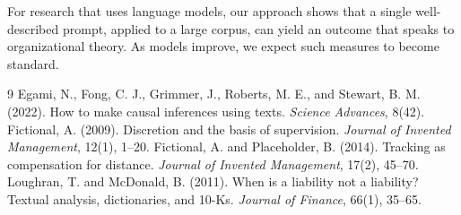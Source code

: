 \documentclass[12pt]{article}
\begin{document}
For research that uses language models, our approach shows that a single well-described prompt, applied to a large corpus, can yield an outcome that speaks to organizational theory. As models improve, we expect such measures to become standard.

\begin{thebibliography}{9}
 Egami, N., Fong, C. J., Grimmer, J., Roberts, M. E., and Stewart, B. M. (2022). How to make causal inferences using texts. \emph{Science Advances}, 8(42).
 Fictional, A. (2009). Discretion and the basis of supervision. \emph{Journal of Invented Management}, 12(1), 1--20.
 Fictional, A. and Placeholder, B. (2014). Tracking as compensation for distance. \emph{Journal of Invented Management}, 17(2), 45--70.
 Loughran, T. and McDonald, B. (2011). When is a liability not a liability? Textual analysis, dictionaries, and 10-Ks. \emph{Journal of Finance}, 66(1), 35--65.
\end{thebibliography}
\end{document}

